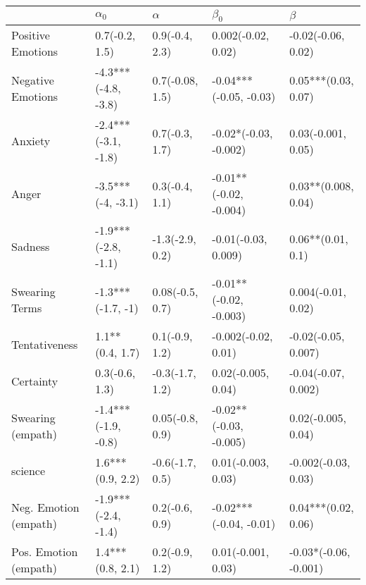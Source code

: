 \begin{tabular}{lllll}
\toprule
{} &           $\alpha_0$ &         $\alpha$ &               $\beta_0$ &                $\beta$ \\
\midrule
Positive Emotions     &       0.7(-0.2, 1.5) &   0.9(-0.4, 2.3) &      0.002(-0.02, 0.02) &     -0.02(-0.06, 0.02) \\
Negative Emotions     &  -4.3***(-4.8, -3.8) &  0.7(-0.08, 1.5) &  -0.04***(-0.05, -0.03) &    0.05***(0.03, 0.07) \\
Anxiety               &  -2.4***(-3.1, -1.8) &   0.7(-0.3, 1.7) &   -0.02*(-0.03, -0.002) &     0.03(-0.001, 0.05) \\
Anger                 &    -3.5***(-4, -3.1) &   0.3(-0.4, 1.1) &  -0.01**(-0.02, -0.004) &    0.03**(0.008, 0.04) \\
Sadness               &  -1.9***(-2.8, -1.1) &  -1.3(-2.9, 0.2) &     -0.01(-0.03, 0.009) &      0.06**(0.01, 0.1) \\
Swearing Terms        &    -1.3***(-1.7, -1) &  0.08(-0.5, 0.7) &  -0.01**(-0.02, -0.003) &     0.004(-0.01, 0.02) \\
Tentativeness         &      1.1**(0.4, 1.7) &   0.1(-0.9, 1.2) &     -0.002(-0.02, 0.01) &    -0.02(-0.05, 0.007) \\
Certainty             &       0.3(-0.6, 1.3) &  -0.3(-1.7, 1.2) &      0.02(-0.005, 0.04) &    -0.04(-0.07, 0.002) \\
Swearing (empath)     &  -1.4***(-1.9, -0.8) &  0.05(-0.8, 0.9) &  -0.02**(-0.03, -0.005) &     0.02(-0.005, 0.04) \\
science               &     1.6***(0.9, 2.2) &  -0.6(-1.7, 0.5) &      0.01(-0.003, 0.03) &    -0.002(-0.03, 0.03) \\
Neg. Emotion (empath) &  -1.9***(-2.4, -1.4) &   0.2(-0.6, 0.9) &  -0.02***(-0.04, -0.01) &    0.04***(0.02, 0.06) \\
Pos. Emotion (empath) &     1.4***(0.8, 2.1) &   0.2(-0.9, 1.2) &      0.01(-0.001, 0.03) &  -0.03*(-0.06, -0.001) \\
\bottomrule
\end{tabular}
